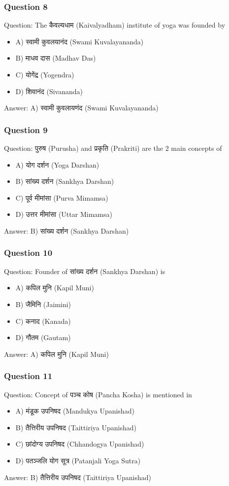 \begin{frame}[fragile]\frametitle{Question 8}
Question: The कैवल्यधाम (Kaivalyadham) institute of yoga was founded by
\begin{itemize}
\item A) स्वामी  कुवलयानंद   (Swami Kuvalayananda)
\item B) माधव दास (Madhav Das)
\item C) योगेंद्र (Yogendra)
\item D) शिवानंद (Sivananda)
\end{itemize}
Answer: A) स्वामी कुवलायणंद (Swami Kuvalayananda)
\end{frame}

\begin{frame}[fragile]\frametitle{Question 9}
Question: पुरुष (Purusha) and प्रकृति (Prakriti) are the 2 main concepts of
\begin{itemize}
\item A) योग दर्शन (Yoga Darshan)
\item B) सांख्य दर्शन (Sankhya Darshan)
\item C) पूर्व मीमांसा (Purva Mimamsa)
\item D) उत्तर मीमांसा (Uttar Mimamsa)
\end{itemize}
Answer: B) सांख्य दर्शन (Sankhya Darshan)
\end{frame}

\begin{frame}[fragile]\frametitle{Question 10}
Question: Founder of सांख्य दर्शन (Sankhya Darshan) is
\begin{itemize}
\item A) कपिल मुनि (Kapil Muni)
\item B) जैमिनि (Jaimini)
\item C) कनाद (Kanada)
\item D) गौतम (Gautam)
\end{itemize}
Answer: A) कपिल मुनि (Kapil Muni)
\end{frame}

\begin{frame}[fragile]\frametitle{Question 11}
Question: Concept of पञ्च कोष (Pancha Kosha) is mentioned in
\begin{itemize}
\item A) मंडूक उपनिषद (Mandukya Upanishad)
\item B) तैत्तिरीय उपनिषद (Taittiriya Upanishad)
\item C) छांदोग्य उपनिषद (Chhandogya Upanishad)
\item D) पतञ्जलि योग सूत्र (Patanjali Yoga Sutra)
\end{itemize}
Answer: B) तैत्तिरीय उपनिषद (Taittiriya Upanishad)
\end{frame}


